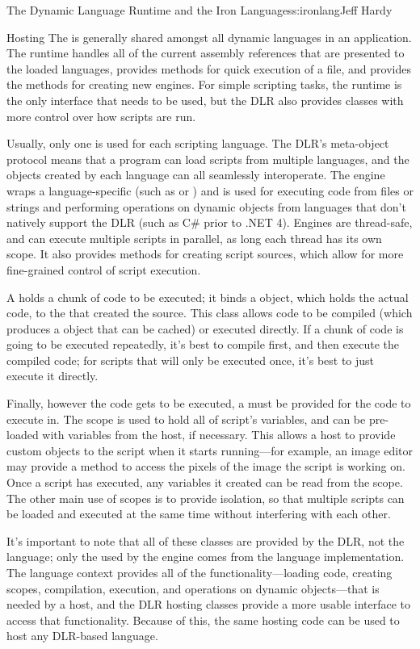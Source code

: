 \begin{aosachapter}{The Dynamic Language Runtime and the Iron Languages}{s:ironlang}{Jeff Hardy}
\begin{aosasect1}{Hosting}
The  is generally shared amongst all dynamic languages in
an application. The runtime handles all of the current assembly references that
are presented to the loaded languages, provides methods for quick execution of
a file, and provides the methods for creating new engines. For simple scripting
tasks, the runtime is the only interface that needs to be used, but the DLR
also provides classes with more control over how scripts are run.

Usually, only one  is used for each scripting language. The
DLR's meta-object protocol means that a program can load scripts from multiple
languages, and the objects created by each language can all seamlessly
interoperate. The engine wraps a language-specific  (such
as  or ) and is used for executing code
from files or strings and performing operations on dynamic objects from
languages that don't natively support the DLR (such as C\# prior to .NET 4).
Engines are thread-safe, and can execute multiple scripts in parallel, as long
each thread has its own scope. It also provides methods for creating script
sources, which allow for more fine-grained control of script execution. 

A  holds a chunk of code to be executed; it binds a
 object, which holds the actual code, to the
 that created the source. This class allows code to be
compiled (which produces a  object that can be cached) or
executed directly. If a chunk of code is going to be executed repeatedly, it's
best to compile first, and then execute the compiled code; for scripts that
will only be executed once, it's best to just execute it directly.

Finally, however the code gets to be executed, a  must be
provided for the code to execute in. The scope is used to hold all of script's
variables, and can be pre-loaded with variables from the host, if necessary.
This allows a host to provide custom objects to the script when it starts
running---for example, an image editor may provide a method to access the
pixels of the image the script is working on. Once a script has executed, any
variables it created can be read from the scope. The other main use of scopes is to
provide isolation, so that multiple scripts can be loaded and executed at the
same time without interfering with each other.

It's important to note that all of these classes are provided by the DLR, not
the language; only the  used by the engine comes from the
language implementation. The language context provides all of the
functionality---loading code, creating scopes, compilation, execution, and
operations on dynamic objects---that is needed by a host, and the DLR hosting
classes provide a more usable interface to access that functionality. Because
of this, the same hosting code can be used to host any DLR-based language.


\end{aosasect1}
\end{aosachapter}
